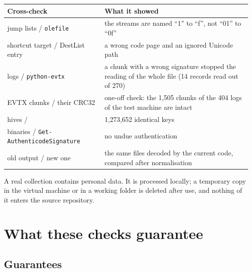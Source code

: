 \documentclass[11pt,a4paper,oneside]{report}
\begin{document}
\begin{longtable}{@{}L{5.4cm}L{9.6cm}@{}}
\toprule
\textbf{Cross-check} & \textbf{What it showed} \\
\midrule
\endhead
jump lists / \texttt{olefile} & the streams are named ``1'' to ``f'', not
  ``01'' to ``0f'' \\
shortcut target / DestList entry & a wrong code page and an ignored Unicode
  path \\
logs / \texttt{python-evtx} & a chunk with a wrong signature stopped the
  reading of the whole file (14 records read out of 270) \\
EVTX chunks / their CRC32 & one-off check: the 1,505 chunks of the 404 logs of
  the test machine are intact \\
hives /  & 1,273,652 identical keys \\
binaries / \texttt{Get-AuthenticodeSignature} & no undue authentication \\
old output / new one & the same files decoded by the current code, compared
  after normalisation \\
\bottomrule
\end{longtable}

\begin{note}
A real collection contains personal data. It is processed locally; a temporary
copy in the virtual machine or in a working folder is deleted after use, and
nothing of it enters the source repository.
\end{note}

\chapter{What these checks guarantee}

\section{Guarantees}
\end{document}
